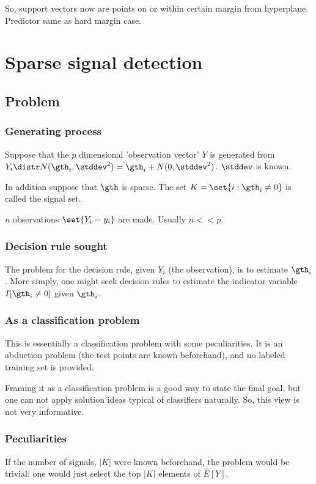 \documentclass[oneside, article]{memoir}
\begin{document}
So, support vectors now are points on or within certain margin from hyperplane. Predictor same as hard margin case.

\chapter{Sparse signal detection}
\section{Problem}
\subsection{Generating process}
Suppose that the $p$ dimensional 'observation vector' $Y$ is generated from $Y_i \distr N(\gth_i, \stddev^2) = \gth_i + N(0, \stddev^2)$. $\stddev$ is known.

In addition suppose that $\gth$ is sparse. The set $K = \set{i: \gth_i \neq 0}$ is called the signal set.

$n$ observations $\set{Y_i = y_i}$ are made. Usually $n << p$.

\subsection{Decision rule sought}
The problem for the decision rule, given $Y_i$ (the observation), is to estimate $\gth_i$. More simply, one might seek decision rules to estimate the indicator variable $I[\gth_i \neq 0]$ given $\gth_i$.

\subsection{As a classification problem}
This is essentially a classification problem with some peculiarities. It is an abduction problem (the test points are known beforehand), and no labeled training set is provided.

Framing it as a classification problem is a good way to state the final goal, but one can not apply solution ideas typical of classifiers naturally. So, this view is not very informative.

\subsection{Peculiarities}
If the number of signals, $|K|$ were known beforehand, the problem would be trivial: one would just select the top $|K|$ elements of $\hat{E}[Y]$.
\end{document}
